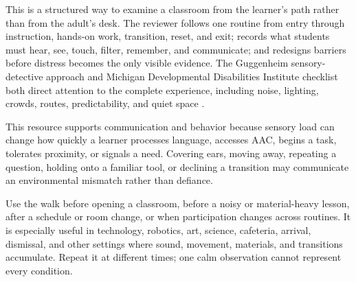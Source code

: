 
\vspace{-0.5cm}

This is a structured way to examine a classroom from the learner's path rather than from the adult's desk. The reviewer follows one routine from entry through instruction, hands-on work, transition, reset, and exit; records what students must hear, see, touch, filter, remember, and communicate; and redesigns barriers before distress becomes the only visible evidence. The Guggenheim sensory-detective approach and Michigan Developmental Disabilities Institute checklist both direct attention to the complete experience, including noise, lighting, crowds, routes, predictability, and quiet space \citep{guggenheimSensory,michigan2025sensory}.

This resource supports communication and behavior because sensory load can change how quickly a learner processes language, accesses AAC, begins a task, tolerates proximity, or signals a need. Covering ears, moving away, repeating a question, holding onto a familiar tool, or declining a transition may communicate an environmental mismatch rather than defiance.


Use the walk before opening a classroom, before a noisy or material-heavy lesson, after a schedule or room change, or when participation changes across routines. It is especially useful in technology, robotics, art, science, cafeteria, arrival, dismissal, and other settings where sound, movement, materials, and transitions accumulate. Repeat it at different times; one calm observation cannot represent every condition.


